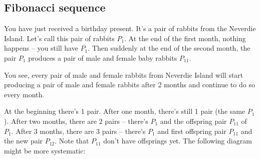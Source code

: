 \subsection{Fibonacci sequence}

You have just received a birthday present. It's a pair of rabbits from the
Neverdie Island.
Let's call this pair of rabbits $P_1$.
At the end of the first month, nothing happens -- you still have $P_1$.
Then suddenly at the end of the second month,
the pair $P_1$ produces a pair of male and
female baby rabbits $P_{11}$.

You see, every pair of male and female rabbits from Neverdie Island will
start producing
a pair of male and female rabbits after 2 months and continue to do so
every month.

At the beginning there's 1 pair.
After one month, there's still 1 pair (the same $P_1$).
After two months, there are 2 pairs -- there's $P_1$ and the offspring pair
$P_{11}$ of $P_1$.
After 3 months, there are 3 pairs -- there's $P_1$ and first offspring pair
$P_{11}$
and the new pair $P_{12}$. Note that $P_{11}$ don't have offsprings yet.
The following diagram might be more systematic:
  
